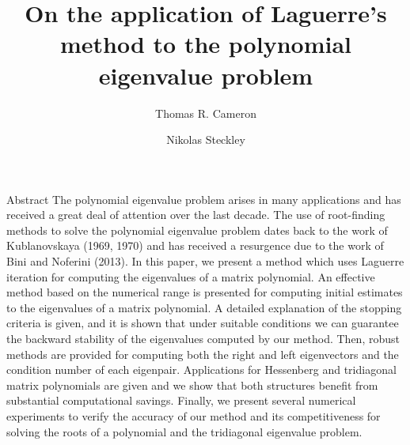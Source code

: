 \documentclass[final,hyperref={pdfpagelabels=false}]{beamer}
\title[Fancy Posters]{On the application of Laguerre's method to the polynomial eigenvalue problem}
\author[Cameron \& Steckley]{Thomas R. Cameron \and Nikolas Steckley}
\institute[Davidson College \& Portland State University]{Davidson College \& Portland State University}
\date{}
\begin{document}
	\maketitle
	
	\begin{block}{\large Abstract}
		The polynomial eigenvalue problem arises in many applications and has received a great deal of attention over the last decade. The use of root-finding methods to solve the polynomial eigenvalue problem dates back to the work of Kublanovskaya (1969, 1970) and has received a resurgence due to the work of Bini and Noferini (2013). In this paper, we present a method which uses Laguerre iteration for computing the eigenvalues of a matrix polynomial. An effective method based on the numerical range is presented for computing initial estimates to the eigenvalues of a matrix polynomial. A detailed explanation of the stopping criteria is given, and it is shown that under suitable conditions we can guarantee the backward stability of the eigenvalues computed by our method. Then, robust methods are provided for computing both the right and left eigenvectors and the condition number of each eigenpair. Applications for Hessenberg and tridiagonal matrix polynomials are given and we show that both structures benefit from substantial computational savings. Finally, we present several numerical experiments to verify the accuracy of our method and its competitiveness for solving the roots of a polynomial and the tridiagonal eigenvalue problem. 
	\end{block}
\end{document}
